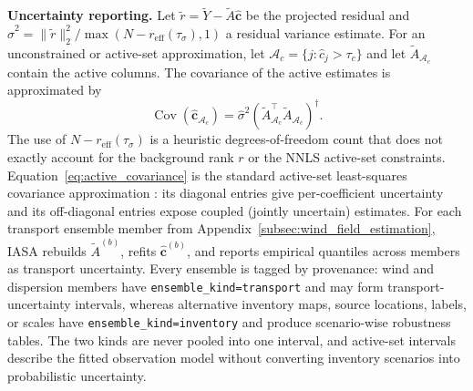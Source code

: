 \noindent\textbf{Uncertainty reporting.}
Let \(\widetilde r=\widetilde Y-\widetilde A\widehat{\mathbf c}\) be the
projected residual and
\(\widehat\sigma^2=\|\widetilde r\|_2^2/\max(N-r_{\mathrm{eff}}(\tau_\sigma),1)\)
a residual variance estimate.  For an unconstrained or active-set approximation,
let \(\mathcal A_c=\{j:\widehat c_j>\tau_c\}\) and let
\(\widetilde A_{\mathcal A_c}\) contain the active columns.  The covariance
of the active estimates is approximated by
\begin{equation}
\operatorname{Cov}(\widehat{\mathbf c}_{\mathcal A_c})
=
\widehat\sigma^2
(\widetilde A_{\mathcal A_c}^\top
\widetilde A_{\mathcal A_c})^\dagger.
\label{eq:active_covariance}
\end{equation}
The use of \(N-r_{\mathrm{eff}}(\tau_\sigma)\) is a heuristic degrees-of-freedom
count that does not exactly account for the background rank \(r\) or the NNLS
active-set constraints.  Equation~\ref{eq:active_covariance} is the standard
active-set least-squares covariance approximation
\citep{seber2003linear}: its diagonal entries give per-coefficient uncertainty
and its off-diagonal entries expose coupled (jointly uncertain) estimates.  For
each transport ensemble member from
Appendix~\ref{subsec:wind_field_estimation}, IASA rebuilds
\(\widetilde A^{(b)}\), refits \(\widehat{\mathbf c}^{(b)}\), and reports
empirical quantiles across members as transport uncertainty.  Every ensemble is
tagged by provenance: wind and dispersion members have
\texttt{ensemble\_kind=transport} and may form transport-uncertainty intervals,
whereas alternative inventory maps, source locations, labels, or scales have
\texttt{ensemble\_kind=inventory} and produce scenario-wise robustness tables.
The two kinds are never pooled into one interval, and active-set intervals
describe the fitted observation model without converting inventory scenarios into
probabilistic uncertainty.


